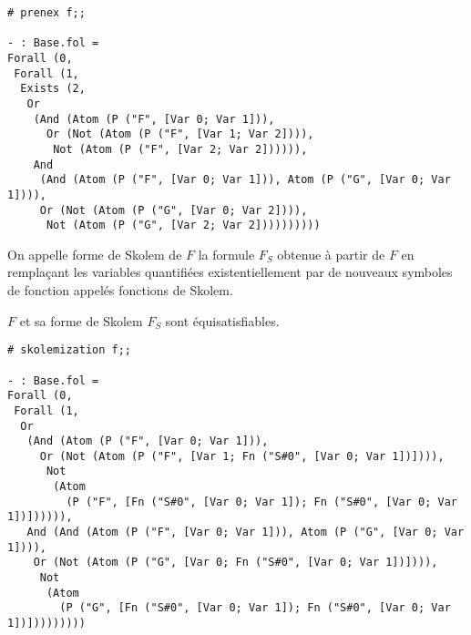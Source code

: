 \documentclass[9pt]{beamer}
\begin{document}
\begin{frame}[fragile]
\begin{lstlisting}
# prenex f;;

- : Base.fol =
Forall (0,
 Forall (1,
  Exists (2,
   Or
    (And (Atom (P ("F", [Var 0; Var 1])),
      Or (Not (Atom (P ("F", [Var 1; Var 2]))),
       Not (Atom (P ("F", [Var 2; Var 2]))))),
    And
     (And (Atom (P ("F", [Var 0; Var 1])), Atom (P ("G", [Var 0; Var 1]))),
     Or (Not (Atom (P ("G", [Var 0; Var 2]))),
      Not (Atom (P ("G", [Var 2; Var 2])))))))))
\end{lstlisting}
\end{frame}

\begin{frame}
  \begin{center}
    
  \end{center}
\end{frame}

\begin{frame}
On appelle forme de Skolem de $F$ la formule $F_S$ obtenue à partir de $F$ en remplaçant les variables quantifiées existentiellement par de nouveaux symboles de fonction appelés fonctions de Skolem.
\begin{theorem}
  $F$ et sa forme de Skolem $F_S$ sont équisatisfiables.
\end{theorem}
\end{frame}

\begin{frame}[fragile]
\begin{lstlisting}[name=interp]
# skolemization f;;

- : Base.fol =
Forall (0,
 Forall (1,
  Or
   (And (Atom (P ("F", [Var 0; Var 1])),
     Or (Not (Atom (P ("F", [Var 1; Fn ("S#0", [Var 0; Var 1])]))),
      Not
       (Atom
         (P ("F", [Fn ("S#0", [Var 0; Var 1]); Fn ("S#0", [Var 0; Var 1])]))))),
   And (And (Atom (P ("F", [Var 0; Var 1])), Atom (P ("G", [Var 0; Var 1]))),
    Or (Not (Atom (P ("G", [Var 0; Fn ("S#0", [Var 0; Var 1])]))),
     Not
      (Atom
        (P ("G", [Fn ("S#0", [Var 0; Var 1]); Fn ("S#0", [Var 0; Var 1])]))))))))
\end{lstlisting}
\end{frame}

\begin{frame}
  \begin{center}
    
  \end{center}
\end{frame}
\end{document}
